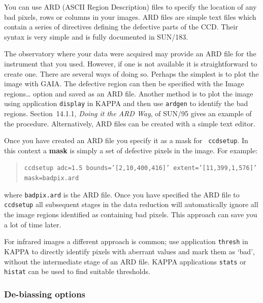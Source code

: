 \documentclass[twoside,11pt]{article}
\newcommand{\xref}[3]{#1}
\begin{document}
You can use ARD (ASCII Region Description) files to specify the location
of any bad pixels, rows or columns in your images.  ARD files are simple
text files which contain a series of directives defining the defective
parts of the CCD.  Their syntax is very simple and is fully documented
in \xref{SUN/183}{sun183}{}\/\cite{SUN183}.

The observatory where your data were acquired may provide an ARD file for
the instrument that you used.  However, if one is not available it is
straightforward to create one.  There are several ways of doing so.
Perhaps the simplest is to plot the image with GAIA.  The defective region
can then be specified with the {\sf Image regions\ldots} option and saved
as an ARD file.  Another method is to plot the image using application
\xref{{\tt display}}{sun95}{DISPLAY} in KAPPA and then use
\xref{{\tt ardgen}}{sun95}{ARDGEN} to identify the bad regions.
\xref{Section~14.1.1, {\it Doing it the ARD Way}}{sun95}{se_ardwork}, of
\xref{SUN/95}{sun95}{} gives an example of the procedure.  Alternatively,
ARD files can be created with a simple text editor.

Once you have created an ARD file you specify it as a mask for {\tt
ccdsetup}.  In this context a {\bf mask} is simply a set of defective
pixels in the image.  For example:

\begin{quote}
{\tt ccdsetup~adc=1.5 bounds='[2,10,400,416]'~extent='[11,399,1,576]' \\
 \hspace*{3mm} mask=badpix.ard}
\end{quote}

where {\tt badpix.ard} is the ARD file.  Once you have specified the
ARD file to {\tt ccdsetup} all subsequent stages in the data reduction
will automatically ignore all the image regions identified as containing
bad pixels.  This approach can save you a lot of time later.

For infrared images a different approach is common; use application
\xref{{\tt thresh}}{sun95}{THRESH} in KAPPA to directly identify
pixels with aberrant values and mark them as `bad', without the
intermediate stage of an ARD file.  KAPPA applications
\xref{{\tt stats}}{sun95}{STATS} or \xref{{\tt histat}}{sun95}{HISTAT}
can be used to find suitable thresholds.

\subsubsection{De-biassing options}
\end{document}
